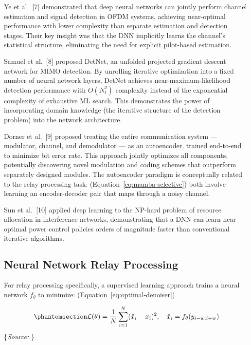 \documentclass[
  english,
  12pt,
  12pt,
  a4paper,
  oneside]{report}
\begin{document}
Ye et al.~{[}7{]} demonstrated that deep neural networks can jointly perform channel estimation and signal detection in OFDM systems, achieving near-optimal performance with lower complexity than separate estimation and detection stages. Their key insight was that the DNN implicitly learns the channel's statistical structure, eliminating the need for explicit pilot-based estimation.

Samuel et al.~{[}8{]} proposed DetNet, an unfolded projected gradient descent network for MIMO detection. By unrolling iterative optimization into a fixed number of neural network layers, DetNet achieves near-maximum-likelihood detection performance with \(O(N_t^2)\) complexity instead of the exponential complexity of exhaustive ML search. This demonstrates the power of incorporating domain knowledge (the iterative structure of the detection problem) into the network architecture.

Dorner et al.~{[}9{]} proposed treating the entire communication system --- modulator, channel, and demodulator --- as an autoencoder, trained end-to-end to minimize bit error rate. This approach jointly optimizes all components, potentially discovering novel modulation and coding schemes that outperform separately designed modules. The autoencoder paradigm is conceptually related to the relay processing task: (Equation~\ref{eq:mamba-selective}) both involve learning an encoder-decoder pair that maps through a noisy channel.

Sun et al.~{[}10{]} applied deep learning to the NP-hard problem of resource allocation in interference networks, demonstrating that a DNN can learn near-optimal power control policies orders of magnitude faster than conventional iterative algorithms.

\subsection{Neural Network Relay Processing}\label{sec:neural-network-relay-processing}

For relay processing specifically, a supervised learning approach trains a neural network \(f_\theta\) to minimize: (Equation~\ref{eq:optimal-denoiser})

\begin{equation}\protect\phantomsection\label{eq:mse-loss}{\mathcal{L}(\theta) = \frac{1}{N} \sum_{i=1}^{N} (\hat{x}_i - x_i)^2, \quad \hat{x}_i = f_\theta(y_{i-w:i+w})
}\end{equation} \footnotesize\{\textit{Source: \1}\}\normalsize
\end{document}
